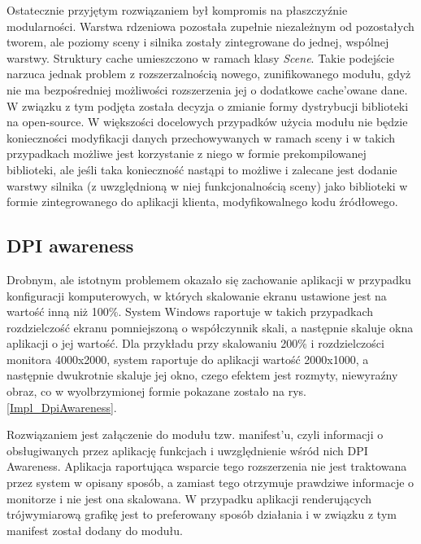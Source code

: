 Ostatecznie przyjętym rozwiązaniem był kompromis na płaszczyźnie modularności. Warstwa rdzeniowa pozostała zupełnie niezależnym od pozostałych tworem, ale poziomy sceny i silnika zostały zintegrowane do jednej, wspólnej warstwy. Struktury cache umieszczono w ramach klasy \textit{Scene}. Takie podejście narzuca jednak problem z rozszerzalnością nowego, zunifikowanego modułu, gdyż nie ma bezpośredniej możliwości rozszerzenia jej o dodatkowe cache'owane dane. W związku z tym podjęta została decyzja o zmianie formy dystrybucji biblioteki na open-source. W większości docelowych przypadków użycia modułu nie będzie konieczności modyfikacji danych przechowywanych w ramach sceny i w takich przypadkach możliwe jest korzystanie z niego w formie prekompilowanej biblioteki, ale jeśli taka konieczność nastąpi to możliwe i zalecane jest dodanie warstwy silnika (z uwzględnioną w niej funkcjonalnością sceny) jako biblioteki w formie zintegrowanego do aplikacji klienta, modyfikowalnego kodu źródłowego. 

\subsection{DPI awareness}
Drobnym, ale istotnym problemem okazało się zachowanie aplikacji w przypadku konfiguracji komputerowych, w których skalowanie ekranu ustawione jest na wartość inną niż 100\%. System Windows raportuje w takich przypadkach rozdzielczość ekranu pomniejszoną o współczynnik skali, a następnie skaluje okna aplikacji o jej wartość. Dla przykładu przy skalowaniu 200\% i rozdzielczości monitora 4000x2000, system raportuje do aplikacji wartość 2000x1000, a następnie dwukrotnie skaluje jej okno, czego efektem jest rozmyty, niewyraźny obraz, co w wyolbrzymionej formie pokazane zostało na rys. \ref{Impl_DpiAwareness}.

Rozwiązaniem jest załączenie do modułu tzw. manifest'u, czyli informacji o obsługiwanych przez aplikację funkcjach i uwzględnienie wśród nich DPI Awareness. Aplikacja raportująca wsparcie tego rozszerzenia nie jest traktowana przez system w opisany sposób, a zamiast tego otrzymuje prawdziwe informacje o monitorze i nie jest ona skalowana. W przypadku aplikacji renderujących trójwymiarową grafikę jest to preferowany sposób działania i w związku z tym manifest został dodany do modułu. 

